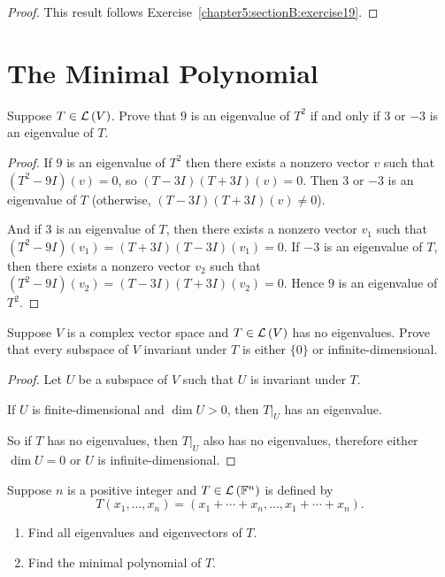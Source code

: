 \begin{proof}
    This result follows Exercise~\ref{chapter5:sectionB:exercise19}.
\end{proof}
\newpage

\section{The Minimal Polynomial}

\begin{exercise}
    Suppose $T\in \mathcal{L}\left({V}\right)$. Prove that $9$ is an eigenvalue of $T^{2}$ if and only if $3$ or $-3$ is an eigenvalue of $T$.
\end{exercise}

\begin{proof}
    If $9$ is an eigenvalue of $T^{2}$ then there exists a nonzero vector $v$ such that $(T^{2} - 9I)(v) = 0$, so $(T - 3I)(T + 3I)(v) = 0$. Then $3$ or $-3$ is an eigenvalue of $T$ (otherwise, $(T - 3I)(T + 3I)(v) \ne 0$).

    And if $3$ is an eigenvalue of $T$, then there exists a nonzero vector $v_{1}$ such that $(T^{2} - 9I)(v_{1}) = (T + 3I)(T - 3I)(v_{1}) = 0$. If $-3$ is an eigenvalue of $T$, then there exists a nonzero vector $v_{2}$ such that $(T^{2} - 9I)(v_{2}) = (T - 3I)(T + 3I)(v_{2}) = 0$. Hence $9$ is an eigenvalue of $T^{2}$.
\end{proof}
\newpage

\begin{exercise}
    Suppose $V$ is a complex vector space and $T\in\mathcal{L}\left({V}\right)$ has no eigenvalues. Prove that every subspace of $V$ invariant under $T$ is either $\{0\}$ or infinite-dimensional.
\end{exercise}

\begin{proof}
    Let $U$ be a subspace of $V$ such that $U$ is invariant under $T$.

    If $U$ is finite-dimensional and $\dim U > 0$, then $T\vert_{U}$ has an eigenvalue.

    So if $T$ has no eigenvalues, then $T\vert_{U}$ also has no eigenvalues, therefore either $\dim U = 0$ or $U$ is infinite-dimensional.
\end{proof}
\newpage

\begin{exercise}
    Suppose $n$ is a positive integer and $T\in\mathcal{L}\left({\mathbb{F}^{n}}\right)$ is defined by
    \[
        T(x_{1}, \ldots, x_{n}) = (x_{1} + \cdots + x_{n}, \ldots, x_{1} + \cdots + x_{n}).
    \]

    \begin{enumerate}[label={(\alph*)}]
        \item Find all eigenvalues and eigenvectors of $T$.
        \item Find the minimal polynomial of $T$.
    \end{enumerate}
\end{exercise}


